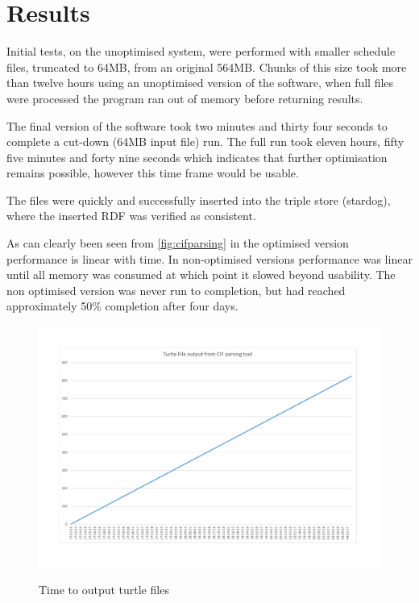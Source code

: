 \section{Results} 
Initial tests, on the unoptimised system, were performed with smaller schedule files, truncated to 64MB, from an original 564MB. Chunks of this size took more than twelve hours using an unoptimised version of the software, when full files were processed the program ran out of memory before returning results.

The final version of the software took two minutes and thirty four seconds to complete a cut-down (64MB input file) run. The full run took eleven hours, fifty five minutes and forty nine seconds which indicates that further optimisation remains possible, however this time frame would be usable.  

The files were quickly and successfully inserted into the triple store (stardog), where the inserted RDF was verified as consistent. 

As can clearly been seen from \autoref{fig:cifparsing} in the optimised version performance is linear with time.  In non-optimised versions performance was linear until all memory was consumed at which point it slowed beyond usability. The non optimised version was never run to completion, but had reached approximately 50\% completion after four days. 

 \begin{figure}
\myfloatalign
{\includegraphics[width=\linewidth]{gfx/scheduleProcessing}} 
\caption{Time to output turtle files}
\label{fig:cifparsing}
\end{figure}

